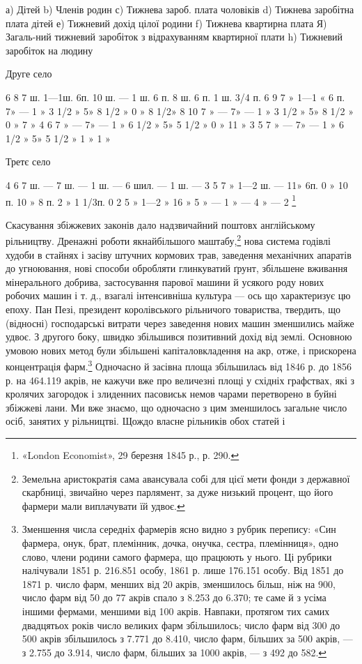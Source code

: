 а) Дітей  b) Членів родин    с) Тижнева зароб. плата чоловіків    d) Тижнева заробітна плата дітей  
 е) Тижневий дохід цілої родини    f) Тижнева квартирна плата    Я) Загаль-ний тижневий заробіток з
відрахуванням квартирної плати    h) Тижневий заробіток на людину

Друге село

6    8    7 ш.    1—1ш. 6п.    10 ш. —  1 ш. 6       п.    8 ш. 6        п.  1 ш. 3/4   п.
6    9    7  »     1—1 «  6 п.     7»      —  1 »    3 1/2 »    5»     8 1/2 »    0 »    8 1/2»
8    10  7  »        —                  7»      —  1 »    3 1/2 »    5»     8 1/2 »    0 »    7     
 »
4    6    7  »        —                  7»      —  1 »     6 1/2 »   5»     5 1/2 »    0 »  11     
 »
3    5    7  »        —                  7»      —  1 »     6 1/2 »   5»     5 1/2 »    1 »    1    
  »

Третє село

4    6    7 ш.         —         7 ш.   —     1 ш.    —       6  шил. —     1 ш.       —
3    5    7  »  1—2 ш. —   11»     6п.   0 »    10 п.   10  »       8 п.  2 »     1 1/3п.
0    2    5  »  1—2 » 16 »  5  »     —     1 »     —         4   »    —        2 \footnote{
«London Economist», 29 березня 1845 р., р. 290.
}

Скасування збіжжевих законів дало надзвичайний поштовх
англійському рільництву. Дренажні роботи якнайбільшого маштабу,\footnote{
Земельна аристократія сама авансувала собі для цієї мети фонди
з державної скарбниці, звичайно через парлямент, за дуже низький
процент, що його фармери мали виплачувати їй удвоє.
}
нова система годівлі худоби в стайнях і засіву штучних
кормових трав, заведення механічних апаратів до угноювання,
нові способи обробляти глинкуватий ґрунт, збільшене вживання
мінерального добрива, застосування парової машини й
усякого роду нових робочих машин і т. д., взагалі інтенсивніша
культура — ось що характеризує цю епоху. Пан Пезі, президент
королівського рільничого товариства, твердить, що (відносні)
господарські витрати через заведення нових машин зменшились
майже удвоє. З другого боку, швидко збільшився позитивний
дохід від землі. Основною умовою нових метод були збільшені
капіталовкладення на акр, отже, і прискорена концентрація
фарм.\footnote{
Зменшення числа середніх фармерів ясно видно з рубрик перепису:
«Син фармера, онук, брат, племінник, дочка, онучка, сестра, племінниця»,
одно слово, члени родини самого фармера, що працюють у
нього. Ці рубрики налічували 1851 р. 216.851 особу, 1861 р. лише 176.151
особу. Від 1851 до 1871 р. число фарм, менших від 20 акрів, зменшилось
більш, ніж на 900, число фарм від 50 до 77 акрів спало з 8.253 до 6.370;
те саме й з усіма іншими фермами, меншими від 100 акрів. Навпаки,
протягом тих самих двадцятьох років число великих фарм збільшилось;
число фарм від 300 до 500 акрів збільшилось з 7.771 до 8.410, число
фарм, більших за 500 акрів, — з 2.755 до 3.914, число фарм, більших
за 1000 акрів, — з 492 до 582.
} Одночасно й засівна площа збільшилась від 1846 р.
до 1856 р. на 464.119 акрів, не кажучи вже про величезні площі
у східніх графствах, які з кролячих загородок і злиденних пасовиськ
немов чарами перетворено в буйні збіжжеві лани. Ми вже
знаємо, що одночасно з цим зменшилось загальне число осіб,
занятих у рільництві. Щождо власне рільників обох статей і